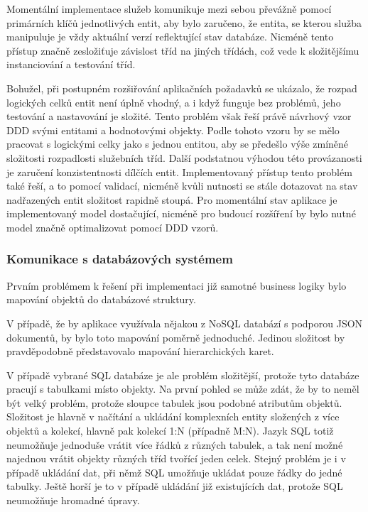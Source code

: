 
		Momentální implementace služeb komunikuje mezi sebou převážně pomocí primárních klíčů jednotlivých entit, aby
		bylo zaručeno, že entita, se kterou služba manipuluje je vždy aktuální verzí reflektující stav databáze.
		Nicméně tento přístup značně zesložiťuje závislost tříd na jiných třídách, což vede k složitějšímu
		instanciování a testování tříd.

		Bohužel, při postupném rozšiřování aplikačních požadavků se ukázalo, že rozpad logických celků entit není úplně
		vhodný, a i když funguje bez problémů, jeho testování a nastavování je složité.
		Tento problém však řeší právě návrhový vzor \ac{DDD} svými entitami a hodnotovými objekty.
		Podle tohoto vzoru by se mělo pracovat s logickými celky jako s jednou entitou, aby se předešlo výše zmíněné složitosti
		rozpadlosti služebních tříd.
		Další podstatnou výhodou této provázanosti je zaručení konzistentnosti dílčích entit.
		Implementovaný přístup tento problém také řeší, a to pomocí validací, nicméně kvůli
		nutnosti se stále dotazovat na stav nadřazených entit složitost rapidně stoupá.
		\cite{ddd_quickly}
		Pro momentální stav aplikace je implementovaný model dostačující, nicméně pro budoucí rozšíření by bylo nutné
		model značně optimalizovat pomocí \ac{DDD} vzorů.

		\subsubsection{Komunikace s databázových systémem}

		Prvním problémem k řešení při implementaci již samotné business logiky bylo mapování objektů do databázové struktury.

		V případě, že by aplikace využívala nějakou z \ac{NoSQL} databází s podporou \ac{JSON} dokumentů, by bylo toto
		mapování poměrně jednoduché.
		Jedinou složitost by pravděpodobně představovalo mapování hierarchických karet.

		V případě vybrané \ac{SQL} databáze je ale problém složitější, protože tyto databáze pracují s tabulkami místo objekty.
		Na první pohled se může zdát, že by to neměl být velký problém, protože sloupce tabulek jsou podobné atributům
		objektů.
		Složitost je hlavně v načítání a ukládání komplexních entity složených z více objektů a kolekcí, hlavně pak
		kolekcí 1:N (případně M:N).
		Jazyk \ac{SQL} totiž neumožňuje jednoduše vrátit více řádků z různých tabulek, a tak není možné najednou
		vrátit objekty různých tříd tvořící jeden celek.
		Stejný problém je i v případě ukládání dat, při němž \ac{SQL} umožňuje ukládat pouze řádky do jedné tabulky.
		Ještě horší je to v případě ukládání již existujících dat, protože \ac{SQL} neumožňuje hromadné úpravy.

